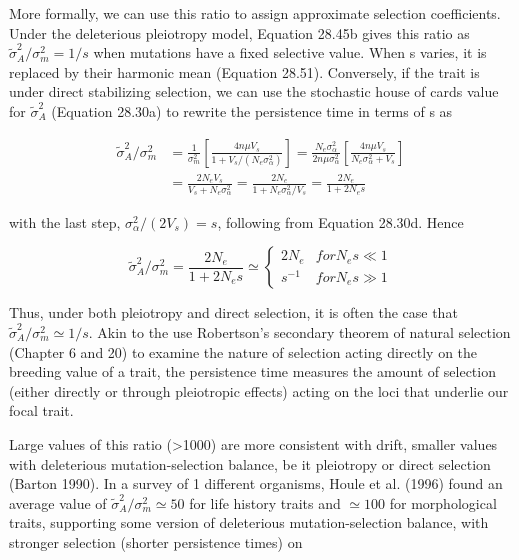 \documentclass{article}
\begin{document}
More formally, we can use this ratio to assign approximate selection coefficients. Under the deleterious pleiotropy model, Equation 28.45b gives this ratio as  $ \tilde{\sigma}_A^2/\sigma_m^2 = 1/s $ when mutations have a fixed selective value. When s varies, it is replaced by their harmonic mean (Equation 28.51). Conversely, if the trait is under direct stabilizing selection, we can use the stochastic house of cards value for  $ \tilde{\sigma}_A^2 $ (Equation 28.30a) to rewrite the persistence time in terms of s as

\begin{equation}
\begin{aligned}\widetilde{\sigma}_{A}^{2}/\sigma_{m}^{2}&=\frac{1}{\sigma_{m}^{2}}\left[\frac{4n\mu V_{s}}{1+V_{s}/(N_{e}\sigma_{\alpha}^{2})}\right]=\frac{N_{e}\sigma_{\alpha}^{2}}{2n\mu\sigma_{\alpha}^{2}}\left[\frac{4n\mu V_{s}}{N_{e}\sigma_{\alpha}^{2}+V_{s}}\right]\\&=\frac{2N_{e}V_{s}}{V_{s}+N_{e}\sigma_{\alpha}^{2}}=\frac{2N_{e}}{1+N_{e}\sigma_{\alpha}^{2}/V_{s}}=\frac{2N_{e}}{1+2N_{e}s}\end{aligned}
\tag{28.53a}
\label{eq:28_53a}
\end{equation}

with the last step,  $ \sigma_{\alpha}^{2}/(2V_{s}) = s $, following from Equation 28.30d. Hence

\begin{equation}
\widetilde{\sigma}_{A}^{2}/\sigma_{m}^{2}=\frac{2N_{e}}{1+2N_{e}s}\simeq\begin{cases}2N_{e}&for N_{e}s\ll1\\s^{-1}&for N_{e}s\gg1\end{cases}
\tag{28.53b}
\label{eq:28_53b}
\end{equation}

Thus, under both pleiotropy and direct selection, it is often the case that  $ \widetilde{\sigma}_{A}^{2}/\sigma_{m}^{2} \simeq 1/s $. Akin to the use Robertson's secondary theorem of natural selection (Chapter 6 and 20) to examine the nature of selection acting directly on the breeding value of a trait, the persistence time measures the amount of selection (either directly or through pleiotropic effects) acting on the loci that underlie our focal trait.

Large values of this ratio (>1000) are more consistent with drift, smaller values with deleterious mutation-selection balance, be it pleiotropy or direct selection (Barton 1990). In a survey of 1 different organisms, Houle et al. (1996) found an average value of  $ \widetilde{\sigma}_{A}^{2}/\sigma_{m}^{2}\simeq50 $ for life history traits and  $ \simeq100 $ for morphological traits, supporting some version of deleterious mutation-selection balance, with stronger selection (shorter persistence times) on
\end{document}
